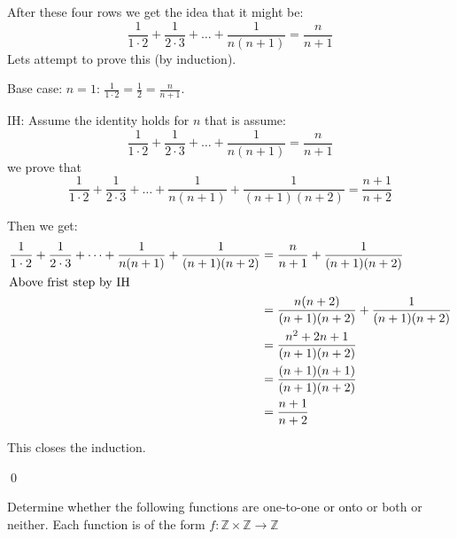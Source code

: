 \documentclass[addpoints]{exam}
\newcommand{\integers}{\mathbb{Z}}
\begin{document}
\begin{questions}
\begin{solution}
    After these four rows we get the idea that it might be:
    \[
      \frac{1}{1\cdot 2} + \frac{1}{2\cdot 3} + \dots + \frac{1}{n(n+1)} = \frac{n}{n+1}
    \]
    Lets attempt to prove this (by induction).

    Base case: $n= 1$: $\frac{1}{1\cdot 2} = \frac{1}{2} = \frac{n}{n+1}$.

    IH: Assume the identity holds for $n$ that is assume:
    \[
      \frac{1}{1\cdot 2} + \frac{1}{2\cdot 3} + \dots + \frac{1}{n(n+1)} = \frac{n}{n+1}
    \]
    we prove that 
    \[
      \frac{1}{1\cdot 2} + \frac{1}{2\cdot 3} + \dots + \frac{1}{n(n+1)} + \frac{1}{(n+1)(n+2)} = \frac{n+1}{n+2}
    \]

    Then we get:
    \begin{align*}
      \frac{1}{1\cdot 2} + \frac{1}{2\cdot 3} + \dots + \frac{1}{n(n+1)} + \frac{1}{(n+1)(n+2)} &= \frac{n}{n+1} + \frac{1}{(n+1)(n+2)}\\
      \intertext{Above frist step by IH}
      &= \frac{n(n+2)}{(n+1)(n+2)} + \frac{1}{(n+1)(n+2)}\\
      &= \frac{n^2 + 2n + 1}{(n+1)(n+2)}\\
      &= \frac{(n+1)(n+1)}{(n+1)(n+2)}\\
      &= \frac{n+1}{n+2}
    \end{align*}

    This closes the induction.

    \qed
  \end{solution}

  \question Determine whether the following functions are one-to-one or onto or both or neither. Each function is of the form $f:\integers \times \integers \to \integers$
\end{questions}
\end{document}
